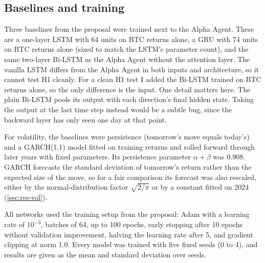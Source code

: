 \subsection{Baselines and training}

Three baselines from the proposal were trained next to the Alpha Agent. These are a one-layer LSTM with 64 units on BTC returns alone, a GRU with 74 units on BTC returns alone (sized to match the LSTM's parameter count), and the same two-layer Bi-LSTM as the Alpha Agent without the attention layer. The vanilla LSTM differs from the Alpha Agent in both inputs and architecture, so it cannot test H1 cleanly. For a clean H1 test I added the Bi-LSTM trained on BTC returns alone, so the only difference is the input. One detail matters here. The plain Bi-LSTM pools its output with each direction's final hidden state. Taking the output at the last time step instead would be a subtle bug, since the backward layer has only seen one day at that point.

For volatility, the baselines were persistence (tomorrow's move equals today's) and a GARCH(1,1) model \cite{bollerslev1986} fitted on training returns and rolled forward through later years with fixed parameters. Its persistence parameter $\alpha+\beta$ was 0.908. GARCH forecasts the standard deviation of tomorrow's return rather than the expected size of the move, so for a fair comparison its forecast was also rescaled, either by the normal-distribution factor $\sqrt{2/\pi}$ or by a constant fitted on 2024 (\cref{sec:res-vol}).

All networks used the training setup from the proposal: Adam \cite{kingma2015} with a learning rate of $10^{-3}$, batches of 64, up to 100 epochs, early stopping after 10 epochs without validation improvement, halving the learning rate after 5, and gradient clipping at norm 1.0. Every model was trained with five fixed seeds (0 to 4), and results are given as the mean and standard deviation over seeds.
